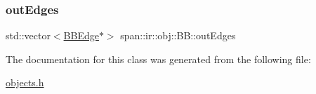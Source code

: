 \mbox{\label{classspan_1_1ir_1_1obj_1_1BB_afc465f9afb8573e400f52fa8641fba85}} 
\subsubsection{\texorpdfstring{out\+Edges}{outEdges}}
{\footnotesize\ttfamily std\+::vector$<$\hyperlink{classspan_1_1ir_1_1obj_1_1BBEdge}{B\+B\+Edge}$\ast$$>$ span\+::ir\+::obj\+::\+B\+B\+::out\+Edges\hspace{0.3cm}{\ttfamily [private]}}



The documentation for this class was generated from the following file\+:\begin{DoxyCompactItemize}
\item 
\hyperlink{objects_8h}{objects.\+h}\end{DoxyCompactItemize}
